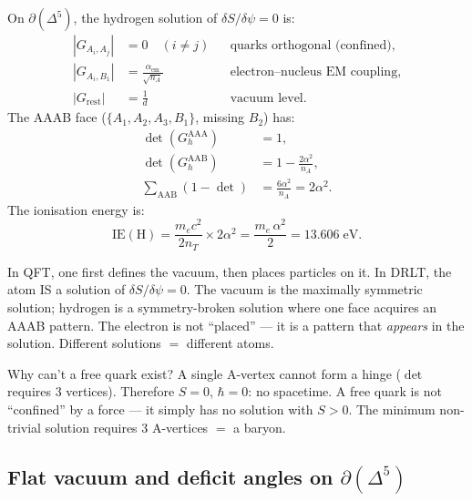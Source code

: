 \begin{remark}
\begin{theorem}
\label{thm:hydrogen_solution}
On $\partial(\Delta^5)$, the hydrogen solution of $\delta S/\delta\psi = 0$ is:
\begin{align}
|G_{A_i, A_j}| &= 0 \quad (i \ne j) &&\text{quarks orthogonal (confined)}, \\
|G_{A_i, B_1}| &= \frac{\alpha_{\mathrm{em}}}{\sqrt{n_A}} &&\text{electron--nucleus EM coupling}, \\
|G_{\mathrm{rest}}| &= \frac{1}{d} &&\text{vacuum level}.
\end{align}
The AAAB face ($\{A_1, A_2, A_3, B_1\}$, missing $B_2$) has:
\begin{align}
\det(G_h^{\mathrm{AAA}}) &= 1, \\
\det(G_h^{\mathrm{AAB}}) &= 1 - \frac{2\alpha^2}{n_A}, \\
\sum_{\mathrm{AAB}} (1 - \det) &= \frac{6\alpha^2}{n_A} = 2\alpha^2.
\end{align}
The ionisation energy is:
\begin{equation}
\boxed{\mathrm{IE}(\mathrm{H}) = \frac{m_e c^2}{2 n_T} \times 2\alpha^2 = \frac{m_e\,\alpha^2}{2} = 13.606\;\mathrm{eV}.}
\end{equation}
\end{theorem}

\begin{remark}
In QFT, one first defines the vacuum, then places particles on it.  In DRLT, the atom IS a solution of $\delta S/\delta\psi = 0$.  The vacuum is the maximally symmetric solution; hydrogen is a symmetry-broken solution where one face acquires an AAAB pattern.  The electron is not ``placed'' --- it is a pattern that \emph{appears} in the solution.  Different solutions $=$ different atoms.
\end{remark}

\begin{remark}
Why can't a free quark exist?  A single A-vertex cannot form a hinge ($\det$ requires 3 vertices).  Therefore $S = 0$, $\hbar = 0$: no spacetime.  A free quark is not ``confined'' by a force --- it simply has no solution with $S > 0$.  The minimum non-trivial solution requires 3 A-vertices $=$ a baryon.
\end{remark}

\subsection{Flat vacuum and deficit angles on $\partial(\Delta^5)$}
\label{sec:flat_vacuum}


\end{remark}
